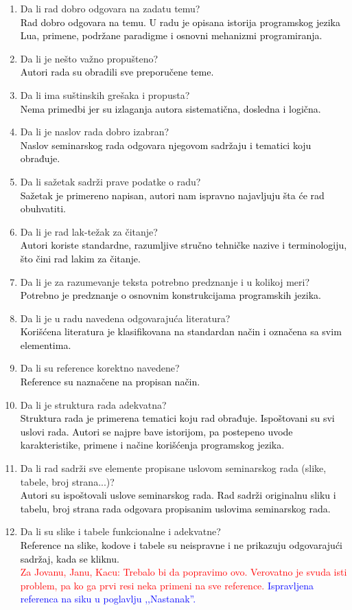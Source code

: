 \documentclass[a4paper]{report}
\newcommand{\odgovor}[1]{\textcolor{black}{#1}}
\newcommand{\odgovorAutora}[1]{\textcolor{blue}{#1}}
\newcommand{\note}[1]{\textcolor{red}{#1}}
\begin{document}
\begin{enumerate}
\item Da li rad dobro odgovara na zadatu temu?\\
\odgovor{Rad dobro odgovara na temu. U radu je opisana istorija programskog jezika Lua, primene, podržane paradigme i osnovni mehanizmi programiranja.}
\item Da li je nešto važno propušteno?\\
\odgovor{Autori rada su obradili sve preporučene teme.}
\item Da li ima suštinskih grešaka i propusta?\\
\odgovor{Nema primedbi jer su izlaganja autora sistematična, dosledna i logična.}
\item Da li je naslov rada dobro izabran?\\
\odgovor{Naslov seminarskog rada odgovara njegovom sadržaju i tematici koju obrađuje.}
\item Da li sažetak sadrži prave podatke o radu?\\
\odgovor{Sažetak je primereno napisan, autori nam ispravno najavljuju šta će rad obuhvatiti.}
\item Da li je rad lak-težak za čitanje?\\
\odgovor{Autori koriste standardne, razumljive stručno tehničke nazive i terminologiju, što čini rad lakim za čitanje.}
\item Da li je za razumevanje teksta potrebno predznanje i u kolikoj meri?\\
\odgovor{Potrebno je predznanje o osnovnim konstrukcijama programskih jezika.}
\item Da li je u radu navedena odgovarajuća literatura?\\
\odgovor{Korišćena literatura je klasifikovana na standardan način i označena sa svim elementima.}
\item Da li su reference korektno navedene?\\
\odgovor{Reference su naznačene na propisan način.}
\item Da li je struktura rada adekvatna?\\
\odgovor{Struktura rada je primerena tematici koju rad obrađuje. Ispoštovani su svi uslovi rada. Autori se najpre bave istorijom, pa postepeno uvode karakteristike, primene i načine korišćenja programskog jezika.}
\item Da li rad sadrži sve elemente propisane uslovom seminarskog rada (slike, tabele, broj strana...)?\\
\odgovor{Autori su ispoštovali uslove seminarskog rada. Rad sadrži originalnu sliku i tabelu, broj strana rada odgovara propisanim uslovima seminarskog rada.}
\item Da li su slike i tabele funkcionalne i adekvatne?\\
\odgovor{Reference na slike, kodove i tabele su neispravne i ne prikazuju odgovarajući sadržaj, kada se kliknu.} \\
\note{Za Jovanu, Janu, Kacu: Trebalo bi da popravimo ovo. Verovatno je svuda isti problem, pa ko ga prvi resi neka primeni na sve reference.}
\odgovorAutora{Ispravljena referenca na siku u poglavlju ,,Nastanak''.}
\end{enumerate}
\end{document}
